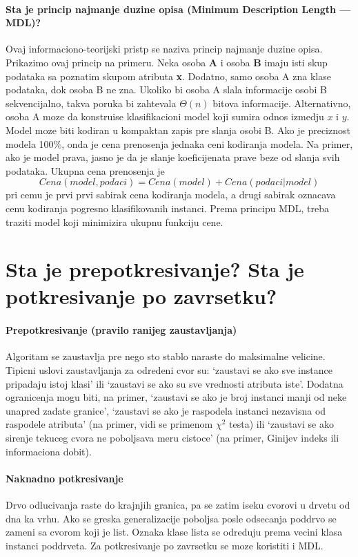 \documentclass[a4paper]{article}
\begin{document}
\paragraph{Sta je princip najmanje duzine opisa (Minimum Description Length --- MDL)?} Ovaj
informaciono-teorijski pristp se naziva princip najmanje duzine opisa. Prikazimo ovaj princip na
primeru. Neka osoba \textbf{A} i osoba \textbf{B} imaju isti skup podataka sa poznatim skupom
atributa \textbf{x}. Dodatno, samo osoba A zna klase podataka, dok osoba B ne zna. Ukoliko bi osoba
A slala informacije osobi B sekvencijalno, takva poruka bi zahtevala \(\Theta(n)\) bitova
informacije. Alternativno, osoba A moze da konstruise klasifikacioni model koji sumira odnos izmedju
\(x\) i \(y\). Model moze biti kodiran u kompaktan zapis pre slanja osobi B. Ako je preciznost
modela 100\%, onda je cena prenosenja jednaka ceni kodiranja modela. Na primer, ako je model prava,
jasno je da je slanje koeficijenata prave beze od slanja svih podataka. Ukupna cena prenosenja je
\[
    Cena(model,podaci) = Cena(model) + Cena(podaci|model)
\]
pri cemu je prvi prvi sabirak cena kodiranja modela, a drugi sabirak oznacava cenu kodiranja
pogresno klasifikovanih instanci. Prema principu MDL, treba traziti model koji minimizira ukupnu
funkciju cene.

\section{Sta je prepotkresivanje? Sta je potkresivanje po zavrsetku?}
\paragraph{Prepotkresivanje (pravilo ranijeg zaustavljanja)} Algoritam se zaustavlja pre nego sto
stablo naraste do maksimalne velicine. Tipicni uslovi zaustavljanja za odredeni cvor su: `zaustavi
se ako sve instance pripadaju istoj klasi' ili `zaustavi se ako su sve vrednosti atributa iste'.
Dodatna ogranicenja mogu biti, na primer, `zaustavi se ako je broj instanci manji od neke unapred
zadate granice', `zaustavi se ako je raspodela instanci nezavisna od raspodele atributa' (na primer,
vidi se primenom \(\chi^2\) testa) ili `zaustavi se ako sirenje tekuceg cvora ne poboljsava meru
cistoce' (na primer, Ginijev indeks ili informaciona dobit).

\paragraph{Naknadno potkresivanje} Drvo odlucivanja raste do krajnjih granica, pa se zatim iseku
cvorovi u drvetu od dna ka vrhu.  Ako se greska generalizacije poboljsa posle odsecanja poddrvo se
zameni sa cvorom koji je list.  Oznaka klase lista se odreduju prema vecini klasa instanci
poddrveta. Za potkresivanje po zavrsetku se moze koristiti i MDL.
\end{document}
